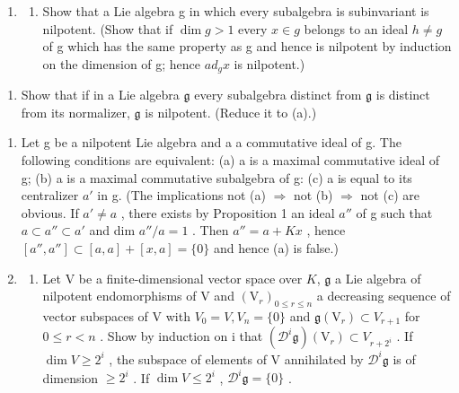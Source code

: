 \begin{enumerate}
\def\labelenumi{\arabic{enumi}.}
\setcounter{enumi}{4}
\tightlist
\item
  \begin{enumerate}
  \def\labelenumii{(\alph{enumii})}
  \tightlist
  \item
    Show that a Lie algebra g in which every subalgebra is subinvariant is nilpotent. (Show that if \(\dim g > 1\) every \(x \in g\) belongs to an ideal \(h \neq g\) of g which has the same property as g and hence is nilpotent by induction on the dimension of g; hence \(ad_{g} x\) is nilpotent.)
  \end{enumerate}
\end{enumerate}

\begin{enumerate}
\def\labelenumi{(\alph{enumi})}
\setcounter{enumi}{1}
\tightlist
\item
  Show that if in a Lie algebra \(\mathfrak{g}\) every subalgebra distinct from \(\mathfrak{g}\) is distinct from its normalizer, \(\mathfrak{g}\) is nilpotent. (Reduce it to (a).)
\end{enumerate}

\begin{enumerate}
\def\labelenumi{\arabic{enumi}.}
\setcounter{enumi}{5}
\item
  Let g be a nilpotent Lie algebra and a a commutative ideal of g. The following conditions are equivalent: (a) a is a maximal commutative ideal of g; (b) a is a maximal commutative subalgebra of g: (c) a is equal to its centralizer \(a'\) in g. (The implications not (a) \(\Rightarrow\) not (b) \(\Rightarrow\) not (c) are obvious. If \(a' \neq a\) , there exists by Proposition 1 an ideal \(a''\) of g such that \(a \subset a'' \subset a'\) and dim \(a''/a = 1\) . Then \(a'' = a + Kx\) , hence \([a'', a''] \subset [a, a] + [x, a] = \{0\}\) and hence (a) is false.)
\item
  \begin{enumerate}
  \def\labelenumii{(\alph{enumii})}
  \tightlist
  \item
    Let V be a finite-dimensional vector space over \(K\), \(\mathfrak{g}\) a Lie algebra of nilpotent endomorphisms of V and \((\mathrm{V}_{r})_{0 \leq r \leq n}\) a decreasing sequence of vector subspaces of V with \(V_{0} = V, V_{n} = \{0\}\) and \(\mathfrak{g}(\mathrm{V}_{r}) \subset V_{r+1}\) for \(0 \leq r < n\) . Show by induction on i that \((\mathcal{D}^{i}\mathfrak{g})(\mathrm{V}_{r}) \subset V_{r+2^{i}}\) . If \(\dim V \geq 2^{i}\) , the subspace of elements of V annihilated by \(\mathcal{D}^{i}\mathfrak{g}\) is of dimension \(\geqslant 2^{i}\) . If \(\dim V \leqslant 2^{i}\) , \(\mathcal{D}^{i}\mathfrak{g} = \{0\}\) .
  \end{enumerate}
\end{enumerate}

